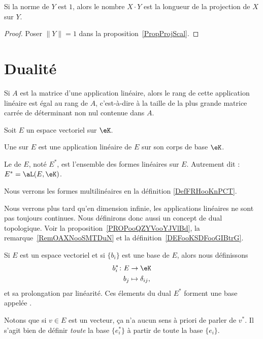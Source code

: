 \begin{corollary}
	Si la norme de \( Y\) est \( 1\), alors le nombre \( X\cdot Y\) est la longueur de la projection de \( X\) sur \( Y\).
\end{corollary}

\begin{proof}
	Poser \( \| Y \|=1\) dans la proposition~\ref{PropProjScal}.
\end{proof}

\section{Dualité}

\begin{proposition} \label{PropEJBZooTNFPRj}
	Si \( A\) est la matrice d'une application linéaire, alors le rang de cette application linéaire est égal au rang de \( A \), c'est-à-dire à la taille de la plus grande matrice carrée de déterminant non nul contenue dans \( A\).
\end{proposition}

\begin{definition}  \label{DefJPGSHpn}
	Soit \( E\) un espace vectoriel sur \( \eK\).

	Une  sur \( E \) est une application linéaire de \( E \) sur son corps de base \( \eK\).

	Le  de \( E\), noté \( E^*\), est l'ensemble des formes linéaires sur \( E\). Autrement dit : \( E^* = \aL(E,\eK)\).
\end{definition}
Nous verrons les formes multilinéaires en la définition \ref{DefFRHooKnPCT}.

Nous verrons plus tard qu'en dimension infinie, les applications linéaires ne sont pas toujours continues. Nous définirons donc aussi un concept de dual topologique. Voir la proposition~\ref{PROPooQZYVooYJVlBd}, la remarque~\ref{RemOAXNooSMTDuN} et la définition~\ref{DEFooKSDFooGIBtrG}.

\begin{lemmaDef}      \label{DEFooTMSEooZFtsqa}
	Si \( E\) est un espace vectoriel et si \( \{ b_i \}\) est une base de \( E\), alors nous définissons
	\begin{equation}
		\begin{aligned}
			b_i^*\colon E & \to \eK              \\
			b_j           & \mapsto \delta_{ij},
		\end{aligned}
	\end{equation}
	et sa prolongation par linéarité. Ces élements du dual \( E^*\) forment une base appelée .
\end{lemmaDef}
Notons que si \( v\in E\) est un vecteur, ça n'a aucun sens à priori de parler de \( v^*\). Il s'agit bien de définir \emph{toute} la base \( \{ e_i^* \}\) à partir de toute la base \( \{ e_i \}\).

